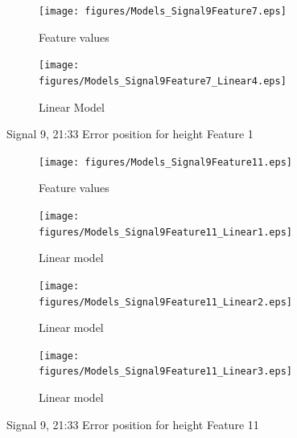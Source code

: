 \documentclass[]{article}
\begin{document}
\begin{figure}[H]
    \centering
		\begin{subfigure}{.5\textwidth}
		  	\centering
    			\texttt{[image: figures/Models\_Signal9Feature7.eps]}
		  	\caption{Feature values}
		  	\label{fig:Models_Signal9Feature7}
		\end{subfigure}%
		\begin{subfigure}{.5\textwidth}
		  	\centering
 		   	\texttt{[image: figures/Models\_Signal9Feature7\_Linear4.eps]}
		  	\caption{Linear Model}
		  	\label{fig:Models_Signal9Feature7_Linear4}
		\end{subfigure}
    \caption{Signal 9, 21:33 Error position for height Feature 1}
    \label{fig:Models_Signal9Feature7_Caption}
\end{figure}





\begin{figure}[H]
	\captionsetup[subfigure]{justification=Centering}
    \centering
		\begin{subfigure}{.45\textwidth}
		  \centering
    			\texttt{[image: figures/Models\_Signal9Feature11.eps]}
		  	\caption{Feature values}
		  	\label{fig:Models_Signal9Feature11}
		\end{subfigure}\hspace{\fill} %
		\begin{subfigure}{.45\textwidth}
		  \centering
 		   	\texttt{[image: figures/Models\_Signal9Feature11\_Linear1.eps]}
		  	\caption{Linear model}
		  	\label{fig:Models_Signal9Feature11_Linear1}
		\end{subfigure}
		\bigskip
		\begin{subfigure}{.45\textwidth}
		  \centering
    			\texttt{[image: figures/Models\_Signal9Feature11\_Linear2.eps]}
		  	\caption{Linear model}
		  	\label{fig:Models_Signal9Feature11_Linear2}
		\end{subfigure}\hspace{\fill} %
		\begin{subfigure}{.45\textwidth}
		  \centering
 		   	\texttt{[image: figures/Models\_Signal9Feature11\_Linear3.eps]}
		  	\caption{Linear model}
		  	\label{fig:Models_Signal9Feature11_Linear3}
		\end{subfigure}
    \caption{Signal 9, 21:33 Error position for height Feature 11}
    \label{fig:Models_Signal9Feature11_Caption}
\end{figure}
\end{document}
